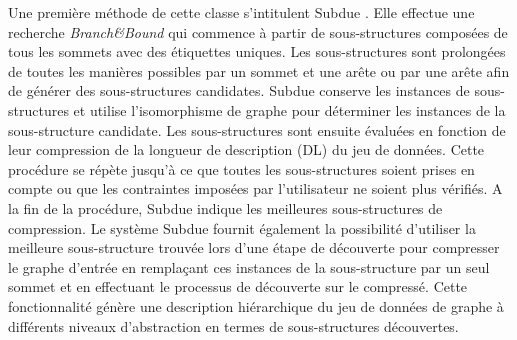 Une première méthode de cette classe s'intitulent Subdue \citep{ketkar2005subdue}. Elle effectue une recherche \textit{Branch\&Bound} qui commence à partir de sous-structures composées de tous les sommets avec des étiquettes uniques. Les sous-structures sont prolongées de toutes les manières possibles par un sommet et une arête ou par une arête afin de générer des sous-structures candidates. Subdue conserve les instances de sous-structures et utilise l'isomorphisme de graphe pour déterminer les instances de la sous-structure candidate. Les sous-structures sont ensuite évaluées en fonction de leur compression de la longueur de description (DL) du jeu de données. Cette procédure se répète jusqu'à ce que toutes les sous-structures soient prises en compte ou que les contraintes imposées par l'utilisateur ne soient plus vérifiés. A la fin de la procédure, Subdue indique les meilleures sous-structures de compression.
				Le système Subdue fournit également la possibilité d'utiliser la meilleure sous-structure trouvée lors d'une étape de découverte pour compresser le graphe d'entrée en remplaçant ces instances de la sous-structure par un seul sommet et en effectuant le processus de découverte sur le  compressé. Cette fonctionnalité génère une description hiérarchique du jeu de données de graphe à différents niveaux d'abstraction en termes de sous-structures découvertes.